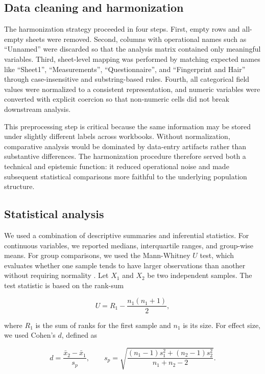 \documentclass[11pt]{article}
\begin{document}
\subsection{Data cleaning and harmonization}
The harmonization strategy proceeded in four steps. First, empty rows and all-empty sheets were removed. Second, columns with operational names such as ``Unnamed'' were discarded so that the analysis matrix contained only meaningful variables. Third, sheet-level mapping was performed by matching expected names like ``Sheet1'', ``Measurements'', ``Questionnaire'', and ``Fingerprint and Hair'' through case-insensitive and substring-based rules. Fourth, all categorical field values were normalized to a consistent representation, and numeric variables were converted with explicit coercion so that non-numeric cells did not break downstream analysis.

This preprocessing step is critical because the same information may be stored under slightly different labels across workbooks. Without normalization, comparative analysis would be dominated by data-entry artifacts rather than substantive differences. The harmonization procedure therefore served both a technical and epistemic function: it reduced operational noise and made subsequent statistical comparisons more faithful to the underlying population structure.

\subsection{Statistical analysis}
We used a combination of descriptive summaries and inferential statistics. For continuous variables, we reported medians, interquartile ranges, and group-wise means. For group comparisons, we used the Mann-Whitney $U$ test, which evaluates whether one sample tends to have larger observations than another without requiring normality \cite{mann1947,wilcoxon1945}. Let $X_1$ and $X_2$ be two independent samples. The test statistic is based on the rank-sum

\begin{equation}
U = R_1 - \frac{n_1(n_1+1)}{2},
\end{equation}

where $R_1$ is the sum of ranks for the first sample and $n_1$ is its size. For effect size, we used Cohen's $d$, defined as

\begin{equation}
 d = \frac{\bar{x}_2 - \bar{x}_1}{s_p}, \qquad s_p = \sqrt{\frac{(n_1-1)s_1^2 + (n_2-1)s_2^2}{n_1+n_2-2}}.
\end{equation}
\end{document}
